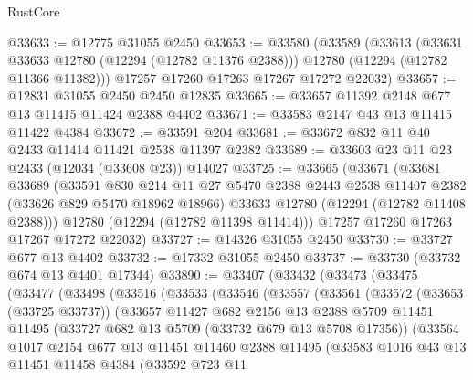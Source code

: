 \begin{lexlean}{RustCore}
\begin{coremodule}
@33633 := @12775 @31055 @2450
@33653 := @33580
    (@33589
      (@33613
        (@33631 @33633 @12780 (@12294 (@12782 @11376 @2388)))
        @12780
        (@12294 (@12782 @11366 @11382)))
      @17257
      @17260
      @17263
      @17267
      @17272
      @22032)
@33657 := @12831 @31055 @2450 @2450 @12835
@33665 := @33657 @11392 @2148 @677 @13 @11415 @11424 @2388 @4402
@33671 := @33583 @2147 @43 @13 @11415 @11422 @4384
@33672 := @33591 @204
@33681 := @33672 @832 @11 @40 @2433 @11414 @11421 @2538 @11397 @2382
@33689 := @33603 @23 @11 @23 @2433 (@12034 (@33608 @23)) @14027
@33725 := @33665
    (@33671
      (@33681
        @33689
        (@33591
          @830
          @214
          @11
          @27
          @5470
          @2388
          @2443
          @2538
          @11407
          @2382
          (@33626 @829 @5470 @18962 @18966)
          @33633
          @12780
          (@12294 (@12782 @11408 @2388)))
        @12780
        (@12294 (@12782 @11398 @11414)))
      @17257
      @17260
      @17263
      @17267
      @17272
      @22032)
@33727 := @14326 @31055 @2450
@33730 := @33727 @677 @13 @4402
@33732 := @17332 @31055 @2450
@33737 := @33730 (@33732 @674 @13 @4401 @17344)
@33890 := @33407
    (@33432
      (@33473
        (@33475
          (@33477
            (@33498
              (@33516
                (@33533
                  (@33546
                    (@33557
                      (@33561
                        (@33572
                          (@33653 (@33725 @33737))
                          (@33657
                            @11427
                            @682
                            @2156
                            @13
                            @2388
                            @5709
                            @11451
                            @11495
                            (@33727 @682 @13 @5709 (@33732 @679 @13 @5708 @17356))
                            (@33564
                              @1017
                              @2154
                              @677
                              @13
                              @11451
                              @11460
                              @2388
                              @11495
                              (@33583
                                @1016
                                @43
                                @13
                                @11451
                                @11458
                                @4384
                                (@33592
                                  @723
                                  @11

\end{coremodule}
\end{lexlean}
